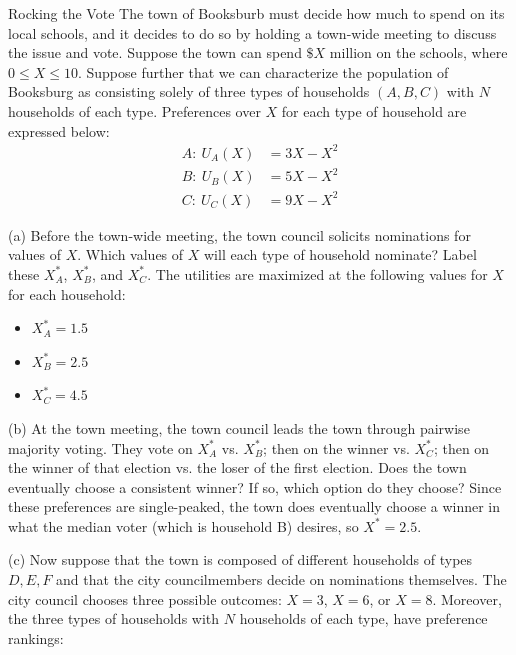 \documentclass[8pt]{extarticle}
\begin{document}
  \begin{problem}{Rocking the Vote}
    The town of Booksburb must decide how much to spend on its local schools, and it decides to do so by holding a town-wide meeting to discuss the issue and vote. Suppose the town can spend $\$X$ million on the schools, where $0\leq X \leq 10$. Suppose further that we can characterize the population of Booksburg as consisting solely of three types of households $(A,B,C)$ with $N$ households of each type. Preferences over $X$ for each type of household are expressed below:
    \begin{align*}
      A:~U_A(X) &= 3X - X^2\\
      B:~U_B(X) &= 5X-X^2\\
      C:~U_C(X) &= 9X-X^2
    \end{align*}
    \tcblower
    \begin{problem}{(a)}
      Before the town-wide meeting, the town council solicits nominations for values of $X$. Which values of $X$ will each type of household nominate? Label these $X_A^*$, $X_B^*$, and $X_C^*$.
      \tcblower
      The utilities are maximized at the following values for $X$ for each household:
      \begin{itemize}
        \item $X_A^* = 1.5$
        \item $X_B^* = 2.5$
        \item $X_C^* = 4.5$
      \end{itemize}
    \end{problem}
    \begin{problem}{(b)}
      At the town meeting, the town council leads the town through pairwise majority voting. They vote on $X_A^*$ vs. $X_B^*$; then on the winner vs. $X_C^*$; then on the winner of that election vs. the loser of the first election. Does the town eventually choose a consistent winner? If so, which option do they choose?
      \tcblower
      Since these preferences are single-peaked, the town does eventually choose a winner in what the median voter (which is household B) desires, so $X^* = 2.5$.
    \end{problem}
    \begin{problem}{(c)}
      Now suppose that the town is composed of different households of types $D,E,F$ and that the city councilmembers decide on nominations themselves. The city council chooses three possible outcomes: $X=3$, $X=6$, or $X=8$. Moreover, the three types of households with $N$ households of each type, have preference rankings:

\end{problem}
\end{problem}
\end{document}
